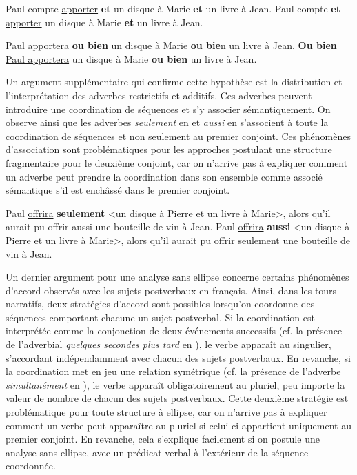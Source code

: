 \ea \label{ch2:ex298}
\ea Paul compte \uline{apporter} \textbf{et} un disque à Marie \textbf{et} un livre à Jean. \label{ch2:ex298a}
\ex *Paul compte \textbf{et} \uline{apporter} un disque à Marie \textbf{et} un livre à Jean. \label{ch2:ex298b} 
\z
\z

\ea \label{ch2:ex299}
\ea \uline{Paul apportera} \textbf{ou bien} un disque à Marie \textbf{ou bie}n un livre à Jean. \label{ch2:ex299a} 
\ex *\textbf{Ou bien} \uline{Paul apportera} un disque à Marie \textbf{ou bien} un livre à Jean. \label{ch2:ex299b} 
\z
\z

Un argument supplémentaire qui confirme cette hypothèse est la distribution et l’interprétation des adverbes restrictifs et additifs. Ces adverbes peuvent introduire une coordination de séquences et s’y associer sémantiquement. On observe ainsi que les adverbes \textit{seulement} en  et \textit{aussi} en  s’associent à toute la coordination de séquences et non seulement au premier conjoint. Ces phénomènes d’association sont problématiques pour les approches postulant une structure fragmentaire pour le deuxième conjoint, car on n’arrive pas à expliquer comment un adverbe peut prendre la coordination dans son ensemble comme associé sémantique s’il est enchâssé dans le premier conjoint.

\ea \label{ch2:ex300} 
\ea Paul \uline{offrira} \textbf{seulement} <un disque à Pierre et un livre à Marie>, alors qu’il aurait pu offrir aussi une bouteille de vin à Jean. \label{ch2:ex300a} 
\ex Paul \uline{offrira} \textbf{aussi} <un disque à Pierre et un livre à Marie>, alors qu’il aurait pu offrir seulement une bouteille de vin à Jean. \label{ch2:ex300b}  
\z
\z

Un dernier argument pour une analyse sans ellipse concerne certains phénomènes d’accord observés avec les sujets postverbaux en français. Ainsi, dans les tours narratifs, deux stratégies d’accord sont possibles lorsqu’on coordonne des séquences comportant chacune un sujet postverbal. Si la coordination est interprétée comme la conjonction de deux événements successifs (cf. la présence de l’adverbial \textit{quelques secondes plus tard} en ), le verbe apparaît au singulier, s’accordant indépendamment avec chacun des sujets postverbaux. En revanche, si la coordination met en jeu une relation symétrique (cf. la présence de l’adverbe \textit{simultanément} en ), le verbe apparaît obligatoirement au pluriel, peu importe la valeur de nombre de chacun des sujets postverbaux. Cette deuxième stratégie est problématique pour toute structure à ellipse, car on n’arrive pas à expliquer comment un verbe peut apparaître au pluriel si celui-ci appartient uniquement au premier conjoint. En revanche, cela s’explique facilement si on postule une analyse sans ellipse, avec un prédicat verbal à l’extérieur de la séquence coordonnée. 

